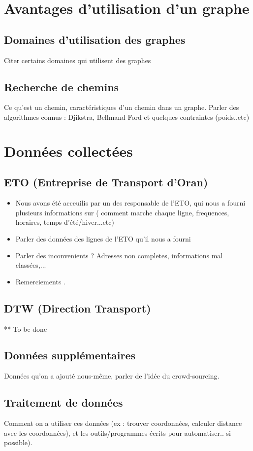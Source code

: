 	\section{Avantages d'utilisation d'un graphe}
	\subsection{Domaines d'utilisation des graphes}
	Citer certains domaines qui utilisent des graphes
	\subsection{Recherche de chemins}
	Ce qu'est un chemin, caractéristiques d'un chemin dans un graphe. Parler des algorithmes connus : Djikstra, Bellmand Ford et quelques contraintes (poids..etc)
	
	\section{Données collectées}
	\subsection{ETO (Entreprise de Transport d'Oran)}
	\begin{itemize}
	\item Nous avons été acceuilis par un des responsable de l'ETO, qui nous a fourni plusieurs informations sur ( comment marche chaque ligne, frequences, horaires, temps d'été/hiver...etc)
	\item Parler des données des lignes de l'ETO qu'il nous a fourni
	\item Parler des inconvenients ? Adresses non completes, informations mal classées,...
	\item Remerciements .
	\end{itemize}
	\subsection{DTW (Direction Transport)}
	** To be done
	\subsection{Données supplémentaires}
	Données qu'on a ajouté nous-même, parler de l'idée du crowd-sourcing.
	\subsection{Traitement de données}
	Comment on a utiliser ces données (ex : trouver coordonnées, calculer distance avec les coordonnées), et les outils/programmes écrits pour automatiser.. si possible).
	
